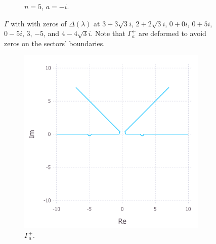\documentclass[12pt, oneside, a4paper]{article}
\begin{document}
\begin{figure}
\begin{subfigure}{.5\textwidth}
        \caption{$n=5$, $a=-i$.}
    \end{subfigure}
    \caption{$\Gamma$ with with zeros of $\Delta(\lambda)$ at $3+3\sqrt{3}i$, $2+2\sqrt{3}i$, $0+0i$, $0+5i$, $0-5i$, $3$, $-5$, and $4-4\sqrt{3}i$. Note that $\Gamma_a^+$ are deformed to avoid zeros on the sectors' boundaries.}
    \label{fig:contourPlots}
\end{figure}

\begin{figure}
    \begin{subfigure}{.5\textwidth}
      \centering
      \includegraphics[width=1\linewidth]{contourPlot_n=2_a=1_gammaAPlus_cropped.pdf}
      \caption{$\Gamma_a^+$.}
    \end{subfigure}%
    \begin{subfigure}{.5\textwidth}
      \centering

\end{subfigure}
\end{figure}
\end{document}
